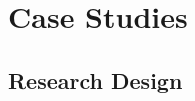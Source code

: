 \documentclass[14pt]{extarticle}
\begin{document}
\section{Case Studies}
\subsection{Research Design}



\end{document}
